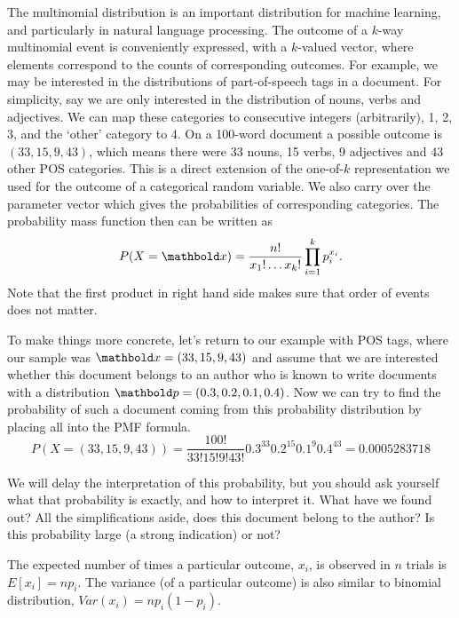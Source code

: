 The multinomial distribution is an important distribution for machine learning,
and particularly in natural language processing.
The outcome of a $k$-way multinomial event is conveniently expressed,
with a $k$-valued vector,
where elements correspond to the counts of corresponding outcomes.
For example,
we may be interested in the distributions of part-of-speech tags in a document.
For simplicity,
say we are only interested in the distribution of nouns,
verbs and adjectives.
We can map these categories to consecutive integers (arbitrarily),
\num{1}, \num{2}, \num{3}, and the `other' category to \num{4}.
On a \num{100}-word document a possible outcome is $(33,15,9,43)$,
which means there were
\num{33} nouns, \num{15} verbs, \num{9} adjectives and \num{43}
other POS categories.
This is a direct extension of the one-of-$k$ representation
we used for the outcome of a categorical random variable.
We also carry over the parameter vector 
which gives the probabilities of corresponding categories.
The probability mass function then can be written as
\[
    P(X=\vect{x}) = \frac{n!}{x_{1}! \ldots x_{k}!}
                    \prod_{i=1}^{k} p_{i}^{x_{i}} .
\]
Note that the first product in right hand side makes sure
that order of events does not matter.

To make things more concrete,
let's return to our example with POS tags,
where our sample was $\vect{x} = (33,15,9,43)$
and assume that we are interested whether this document belongs
to an author who is known to write documents with a distribution
$\vect{p} = (0.3, 0.2, 0.1, 0.4)$.
Now we can try to find the probability of such a document coming
from this probability distribution by placing all into the PMF formula.%
\[
  P(X=(33,15,9,43)) = \frac{100!}{33! 15! 9! 43!}
                    0.3^{33} 0.2^{15} 0.1^{9} 0.4^{43}
                    = 0.0005283718
\]

We will delay the interpretation of this probability,
but you should ask yourself what that probability is exactly,
and how to interpret it.
What have we found out?
All the simplifications aside, 
does this document belong to the author?
Is this probability large (a strong indication) or not?

The expected number of times a particular outcome,
$x_{i}$, is observed in $n$ trials is $E[x_{i}] = n p_{i}$.
The variance (of a particular outcome)
is also similar to binomial distribution,
$Var(x_{i}) = n p_{i} (1 - p_{i})$.

